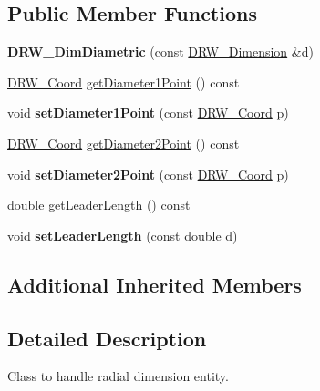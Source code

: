 \subsection*{Public Member Functions}
\begin{DoxyCompactItemize}
\item 
\hypertarget{classDRW__DimDiametric_ad14c3ce69273592cdeec496ac1bf808a}{{\bfseries D\-R\-W\-\_\-\-Dim\-Diametric} (const \hyperlink{classDRW__Dimension}{D\-R\-W\-\_\-\-Dimension} \&d)}\label{classDRW__DimDiametric_ad14c3ce69273592cdeec496ac1bf808a}

\item 
\hyperlink{classDRW__Coord}{D\-R\-W\-\_\-\-Coord} \hyperlink{classDRW__DimDiametric_accc66955a0cfcd75b11c68bebe310d3e}{get\-Diameter1\-Point} () const 
\item 
\hypertarget{classDRW__DimDiametric_aaa546aed9e5340bb10d4801d5d0acb8a}{void {\bfseries set\-Diameter1\-Point} (const \hyperlink{classDRW__Coord}{D\-R\-W\-\_\-\-Coord} p)}\label{classDRW__DimDiametric_aaa546aed9e5340bb10d4801d5d0acb8a}

\item 
\hyperlink{classDRW__Coord}{D\-R\-W\-\_\-\-Coord} \hyperlink{classDRW__DimDiametric_a9228e293ee74e3b70b32189c29de322c}{get\-Diameter2\-Point} () const 
\item 
\hypertarget{classDRW__DimDiametric_aae3e91db83d17bb35fd2e10fdd9e73af}{void {\bfseries set\-Diameter2\-Point} (const \hyperlink{classDRW__Coord}{D\-R\-W\-\_\-\-Coord} p)}\label{classDRW__DimDiametric_aae3e91db83d17bb35fd2e10fdd9e73af}

\item 
double \hyperlink{classDRW__DimDiametric_a1196c1df8bea7de9a9a89c158474cb48}{get\-Leader\-Length} () const 
\item 
\hypertarget{classDRW__DimDiametric_a344c490230fa7e093160dbd63e9ca4df}{void {\bfseries set\-Leader\-Length} (const double d)}\label{classDRW__DimDiametric_a344c490230fa7e093160dbd63e9ca4df}

\end{DoxyCompactItemize}
\subsection*{Additional Inherited Members}


\subsection{Detailed Description}
Class to handle radial dimension entity. 

